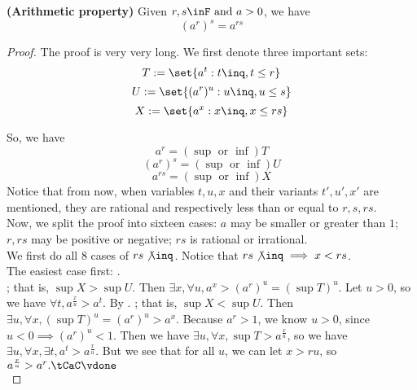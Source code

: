 \documentclass{report}
\begin{document}
\begin{theorem}
\label{1.4.14}
\textbf{(Arithmetic property)} Given $r,s\inF\text{ and }a>0$, we have
\begin{equation*}
  (a^r)^s=a^{rs}
\end{equation*}
\end{theorem}
\begin{proof}
  The proof is very very long. We first denote three important sets:
\begin{equation*}
T:=\set{a^t:t\inq,t\leq r}
\end{equation*}
\begin{equation*}
U:=\set{(a^r)^u:u\inq,u\leq s}
\end{equation*}
\begin{equation*}
X:=\set{a^x:x\inq,x\leq rs}
\end{equation*}

  So, we have 
\begin{equation*}
a^r=(\sup \text{ or }\inf )T
\end{equation*}
\begin{equation*}
(a^r)^s=(\sup \text{ or }\inf )U
\end{equation*}
\begin{equation*}
a^{rs}=(\sup \text{ or }\inf )X
\end{equation*}
Notice that from now, when variables $t,u,x$ and their variants $t',u',x'$ are mentioned, they are rational and respectively less than or equal to $r,s,rs$. \\



  Now, we split the proof into sixteen cases: $a$ may be smaller or greater than $1$; $r,rs$ may be positive or negative; $rs$ is rational or irrational. \\



  We first do all 8 cases of $rs\not\inq$. Notice that $rs\not\inq\implies x<rs$.\\  


  The easiest case first:  .\\

  ; that is, $\sup X>\sup U$. Then $\exists x,\forall u,a^x>(a^r)^u=(\sup T)^u$.  Let $u>0$, so we have $\forall t, a^{\frac{x}{u}}>a^t$. By  \CaC. ; that is, $\sup X<\sup U$. Then $\exists u,\forall x,(\sup T)^u=(a^r)^u>a^x$. Because $a^r>1$, we know $u>0$, since $u<0\implies (a^r)^u<1$. Then we have  $\exists u,\forall x,\sup T>a^{\frac{x}{u}}$, so we have $\exists u,\forall x,\exists t,a^t>a^{\frac{x}{u}}$. But we see that for all $u$, we can let  $x>ru$, so $a^{\frac{x}{u}}>a^r.\tCaC\vdone$   \\




\end{proof}
\end{document}
